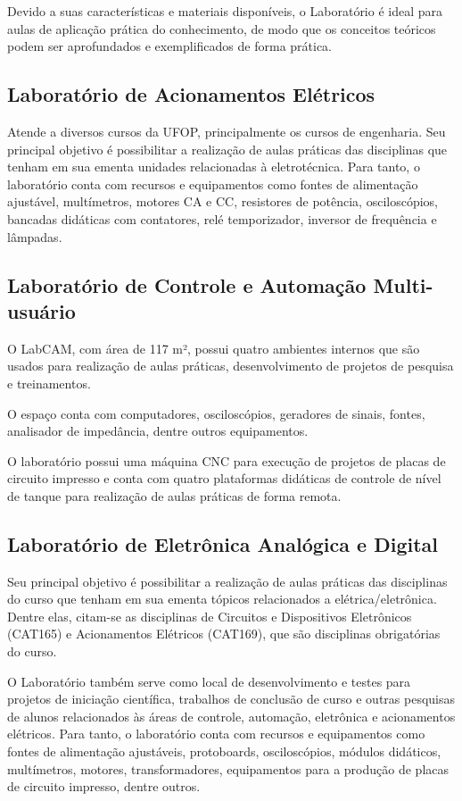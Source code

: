 \documentclass[
	12pt,				%
	openright,			%
	oneside,			%
	a4paper,			%
	english,			%
	brazil				%
	]{abntex2}
\begin{document}
Devido a suas características e materiais disponíveis, o Laboratório é ideal para aulas de aplicação prática do conhecimento, de modo que os conceitos teóricos podem ser aprofundados e exemplificados de forma prática.

\subsection*{Laboratório de Acionamentos Elétricos}

Atende a diversos cursos da UFOP, principalmente os cursos de engenharia. Seu principal objetivo é possibilitar a realização de aulas práticas das disciplinas que tenham em sua ementa unidades relacionadas à eletrotécnica. Para tanto, o laboratório conta com recursos e equipamentos como fontes de alimentação ajustável, multímetros, motores CA e CC, resistores de potência, osciloscópios, bancadas didáticas com contatores, relé temporizador, inversor de frequência e lâmpadas.

\subsection*{Laboratório de Controle e Automação Multi-usuário}

O LabCAM, com área de 117 m², possui quatro ambientes internos que são usados para realização de aulas práticas, desenvolvimento de projetos de pesquisa e treinamentos.

O espaço conta com computadores, osciloscópios, geradores de sinais, fontes, analisador de impedância, dentre outros equipamentos.

O laboratório possui uma máquina CNC para execução de projetos de placas de circuito impresso e conta com quatro plataformas didáticas de controle de nível de tanque para realização de aulas práticas de forma remota.

\subsection*{Laboratório de Eletrônica Analógica e Digital}

Seu principal objetivo é possibilitar a realização de aulas práticas das disciplinas do curso que tenham em sua ementa tópicos relacionados a elétrica/eletrônica. Dentre elas, citam-se as disciplinas de Circuitos e Dispositivos Eletrônicos (CAT165) e Acionamentos Elétricos (CAT169), que são disciplinas obrigatórias do curso.

O Laboratório também serve como local de desenvolvimento e testes para projetos de iniciação científica, trabalhos de conclusão de curso e outras pesquisas de alunos relacionados às áreas de controle, automação, eletrônica e acionamentos elétricos. Para tanto, o laboratório conta com recursos e equipamentos como fontes de alimentação ajustáveis, protoboards, osciloscópios, módulos didáticos, multímetros, motores, transformadores, equipamentos para a produção de placas de circuito impresso, dentre outros.
\end{document}

